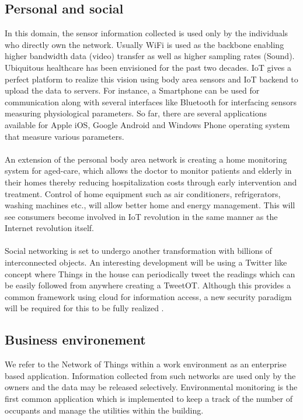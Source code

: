 \documentclass[10pt, twocolumn]{article}
\begin{document}
\subsection{Personal and social} 
In this domain, the sensor information collected is used only by the individuals who directly own the network. Usually WiFi is used as the backbone enabling higher bandwidth data (video) transfer as well as higher sampling rates (Sound).
Ubiquitous healthcare has been envisioned for the past two decades. IoT gives a perfect platform to realize this vision using body area sensors and IoT backend to upload the data to servers. For instance, a Smartphone can be used for communication along with several interfaces like Bluetooth for interfacing sensors measuring physiological parameters. So far, there are several applications available for Apple iOS, Google Android and Windows Phone operating system that measure various parameters.
\paragraph{}
An extension of the personal body area network is creating a home monitoring system for aged-care, which allows the doctor to monitor patients and elderly in their homes thereby reducing hospitalization costs through early intervention and treatment.
Control of home equipment such as air conditioners, refrigerators, washing machines etc., will allow better home and energy management. This will see consumers become involved in IoT revolution in the same manner as the Internet revolution itself.
\paragraph{}
Social networking is set to undergo another transformation with billions of interconnected objects. An interesting development will be using a Twitter like concept where Things in the house can periodically tweet the readings which can be easily followed from anywhere creating a TweetOT. Although this provides a common framework using cloud for information access, a new security paradigm will be required for this to be fully realized \cite{ref1}.
\subsection{Business environement}
We refer to the Network of Things within a work environment as an enterprise based application. Information collected from such networks are used only by the owners and the data may be released selectively. Environmental monitoring is the first common application which is implemented to keep a track of the number of occupants and manage the utilities within the building.
\end{document}
